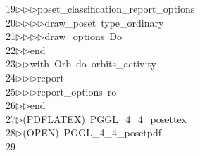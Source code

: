 \begin{tabbing}
19\>$\triangleright$\>$\triangleright$\>$\triangleright$\>poset\_classification\_report\_options\ \\[0pt]
20\>$\triangleright$\>$\triangleright$\>$\triangleright$\>$\triangleright$\>draw\_poset\ type\_ordinary\ \\[0pt]
21\>$\triangleright$\>$\triangleright$\>$\triangleright$\>$\triangleright$\>draw\_options\ Do\ \\[0pt]
22\>$\triangleright$\>$\triangleright$\>end\ \\[0pt]
23\>$\triangleright$\>$\triangleright$\>with\ Orb\ do\ orbits\_activity\ \\[0pt]
24\>$\triangleright$\>$\triangleright$\>$\triangleright$\>report\ \ \\[0pt]
25\>$\triangleright$\>$\triangleright$\>$\triangleright$\>report\_options\ ro\ \\[0pt]
26\>$\triangleright$\>$\triangleright$\>end\ \\[0pt]
27\>$\triangleright$\>(PDFLATEX)\ PGGL\_4\_4\_posettex\\[0pt]
28\>$\triangleright$\>(OPEN)\ PGGL\_4\_4\_posetpdf\\[0pt]
29\>\end{tabbing}
